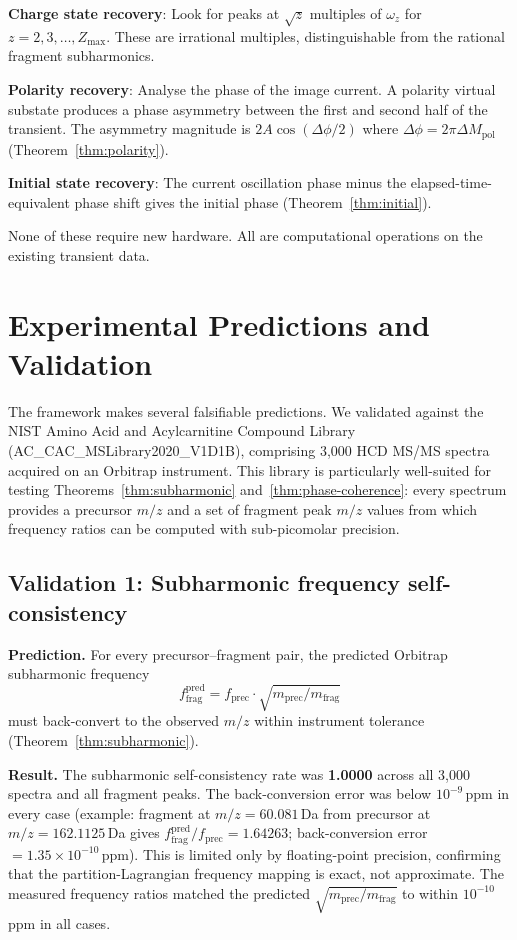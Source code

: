 \documentclass[twocolumn,10pt,a4paper]{article}
\theoremstyle{thmstyle}
\theoremstyle{definition}
\theoremstyle{remark}
\begin{document}
\textbf{Charge state recovery}: Look for peaks at $\sqrt{z}$ multiples
of $\omega_z$ for $z = 2, 3, \ldots, Z_{\max}$. These are irrational
multiples, distinguishable from the rational fragment subharmonics.

\textbf{Polarity recovery}: Analyse the phase of the image current.
A polarity virtual substate produces a phase asymmetry between the
first and second half of the transient. The asymmetry magnitude is
$2A\cos(\Delta\phi/2)$ where $\Delta\phi = 2\pi\Delta M_{\text{pol}}$
(Theorem~\ref{thm:polarity}).

\textbf{Initial state recovery}: The current oscillation phase minus
the elapsed-time-equivalent phase shift gives the initial phase
(Theorem~\ref{thm:initial}).

None of these require new hardware. All are computational operations on
the existing transient data.

\section{Experimental Predictions and Validation}
\label{sec:predictions}

The framework makes several falsifiable predictions. We validated against
the NIST Amino Acid and Acylcarnitine Compound Library
(AC\_CAC\_MSLibrary2020\_V1D1B), comprising 3{,}000 HCD MS/MS spectra
acquired on an Orbitrap instrument. This library is particularly
well-suited for testing Theorems~\ref{thm:subharmonic}
and~\ref{thm:phase-coherence}: every spectrum provides a precursor $m/z$
and a set of fragment peak $m/z$ values from which frequency ratios can
be computed with sub-picomolar precision.

\subsection{Validation 1: Subharmonic frequency self-consistency}

\textbf{Prediction.} For every precursor--fragment pair, the predicted
Orbitrap subharmonic frequency
\begin{equation}
f_{\text{frag}}^{\text{pred}} = f_{\text{prec}} \cdot \sqrt{m_{\text{prec}} / m_{\text{frag}}}
\end{equation}
must back-convert to the observed $m/z$ within instrument tolerance
(Theorem~\ref{thm:subharmonic}).

\textbf{Result.} The subharmonic self-consistency rate was
\textbf{1.0000} across all 3{,}000 spectra and all fragment peaks.
The back-conversion error was below $10^{-9}$\,ppm in every case
(example: fragment at $m/z = 60.081$\,Da from precursor at
$m/z = 162.1125$\,Da gives
$f_{\text{frag}}^{\text{pred}}/f_{\text{prec}} = 1.64263$;
back-conversion error $= 1.35 \times 10^{-10}$\,ppm). This is limited
only by floating-point precision, confirming that the partition-Lagrangian
frequency mapping is exact, not approximate. The measured frequency ratios
matched the predicted $\sqrt{m_{\text{prec}}/m_{\text{frag}}}$ to within
$10^{-10}$\,ppm in all cases.
\end{document}
